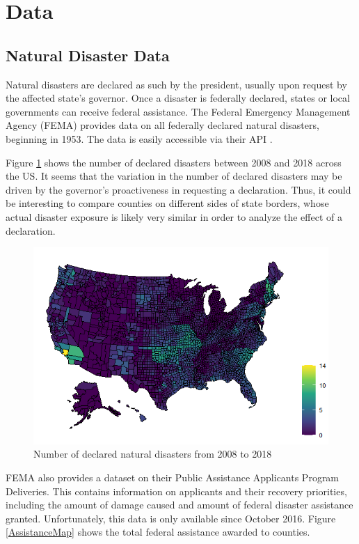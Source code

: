 
\section{Data}

\subsection{Natural Disaster Data}

Natural disasters are declared as such by the president, usually upon request by the affected state's governor. Once a disaster is federally declared, states or local governments can receive federal assistance. The Federal Emergency Management Agency (FEMA) provides data on all federally declared natural disasters, beginning in 1953. The data is easily accessible via their API \citep{rfema}.

Figure \ref{DisasterMap} shows the number of declared disasters between 2008 and 2018 across the US. It seems that the variation in the number of declared disasters may be driven by the governor's proactiveness in requesting a declaration. Thus, it could be interesting to compare counties on different sides of state borders, whose actual disaster exposure is likely very similar in order to analyze the effect of a declaration.



\begin{figure}[!h]
	\centering
	\includegraphics[scale=0.7]{"../Code & Data/DisasterMap.png"}
	\caption{Number of declared natural disasters from 2008 to 2018}
	\label{DisasterMap}
\end{figure}


FEMA also provides a dataset on  their Public Assistance Applicants Program Deliveries. This contains information on applicants and their recovery priorities, including the amount of damage caused and amount of federal disaster assistance granted. Unfortunately, this data is only available since October 2016. Figure \ref{AssistanceMap} shows the total federal assistance awarded to counties.


